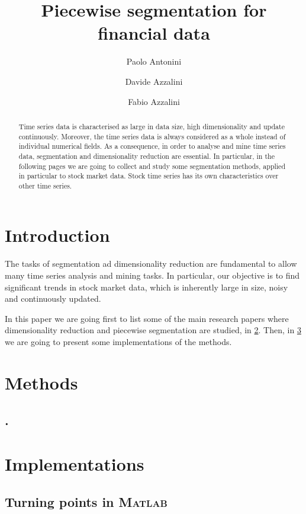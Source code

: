 \documentclass[a4paper]{article}
\title{Piecewise segmentation for financial data}
\author{Paolo Antonini \and Davide Azzalini \and Fabio Azzalini}
\date{}
\newcommand{\matlab}{\textsc{Matlab}\xspace}
\begin{document}
\maketitle

\begin{abstract}
Time series data is characterised as large in data size, high dimensionality and update continuously. Moreover, the time series data is always considered as a whole instead of individual numerical fields. As a consequence, in order to analyse and mine time series data, segmentation and dimensionality reduction are essential. In particular, in the following pages we are going to collect and study some segmentation methods, applied in particular to stock market data. Stock time series has its own characteristics over other time series. 
\end{abstract}

\section{Introduction}
The tasks of segmentation ad dimensionality reduction are fundamental to allow many time series analysis and mining tasks. In particular, our objective is to find significant trends in stock market data, which is inherently large in size, noisy and continuously updated. 

In this paper we are going first to list some of the main research papers where dimensionality reduction and piecewise segmentation are studied, in \cref{sec:methods}. Then, in \cref{sec:implementations} we are going to present some implementations of the methods. 


\section{Methods}\label{sec:methods}
\lipsum[1]

\subsection{\citeauthor{5961935}. }
\lipsum[2-3]


\section{Implementations}\label{sec:implementations}

\lipsum[7]

\subsection{Turning points in \matlab}
\end{document}
